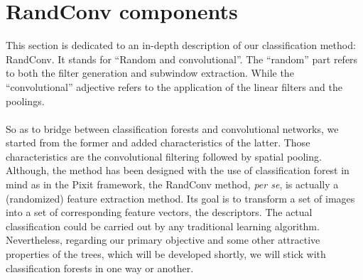 \documentclass[a4paper]{report}
\begin{document}
	\section{RandConv components}
	This section is dedicated to an in-depth description of our classification method: RandConv. It stands for ``Random and 	convolutional''. The ``random'' part refers to both the filter generation and subwindow extraction. While the ``convolutional'' adjective refers to the application of the linear filters and the poolings.
	\paragraph{}
	So as to bridge between classification forests and convolutional networks, we started from the former and added characteristics of the latter. Those characteristics are the convolutional filtering followed by spatial pooling.
	Although, the method has been designed with the use of classification forest in mind as in the Pixit framework, the RandConv method, \textit{per se}, is actually a (randomized) feature extraction method. Its goal is to transform a set of images into a set of corresponding feature vectors, the descriptors. The actual classification could be carried out by any traditional learning algorithm. Nevertheless, regarding our primary objective and some other attractive properties of the trees, which will be developed shortly, we will stick with classification forests in one way or another.

	
\end{document}
